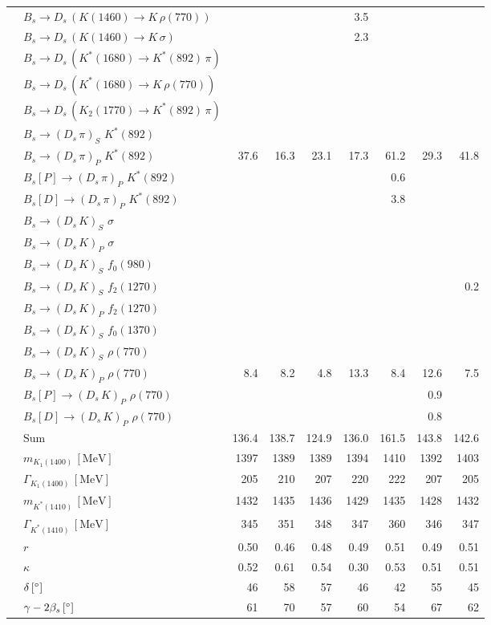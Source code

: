 \begin{tabular}{l l  r  r  r  r  r  r  r  }
 & $B_s \to D_s \, ( K(1460) \to K \, \rho(770) )$ &  &  &  & 3.5 &  &  &  \\ 
 & $B_s \to D_s \, ( K(1460) \to K \, \sigma )$ &  &  &  & 2.3 &  &  &  \\ 
 & $B_s \to D_s \, ( K^{*}(1680) \to K^{*}(892) \, \pi )$ &  &  &  &  &  &  &  \\ 
 & $B_s \to D_s \, ( K^{*}(1680) \to K \, \rho(770) )$ &  &  &  &  &  &  &  \\ 
 & $B_s \to D_s \, ( K_2(1770) \to K^{*}(892) \, \pi )$ &  &  &  &  &  &  &  \\ 
 & $B_s \to ( D_s \, \pi)_{S} \, \, K^{*}(892)$ &  &  &  &  &  &  &  \\ 
 & $B_s \to ( D_s \, \pi)_{P} \, \, K^{*}(892)$ & 37.6 & 16.3 & 23.1 & 17.3 & 61.2 & 29.3 & 41.8 \\ 
 & $B_s[P] \to ( D_s \, \pi)_{P} \, \, K^{*}(892)$ &  &  &  &  & 0.6 &  &  \\ 
 & $B_s[D] \to ( D_s \, \pi)_{P} \, \, K^{*}(892)$ &  &  &  &  & 3.8 &  &  \\ 
 & $B_s \to ( D_s \, K)_{S} \, \, \sigma$ &  &  &  &  &  &  &  \\ 
 & $B_s \to ( D_s \, K)_{P} \, \, \sigma$ &  &  &  &  &  &  &  \\ 
 & $B_s \to ( D_s \, K)_{S} \, \, f_0(980)$ &  &  &  &  &  &  &  \\ 
 & $B_s \to ( D_s \, K)_{S} \, \, f_2(1270)$ &  &  &  &  &  &  & 0.2 \\ 
 & $B_s \to ( D_s \, K)_{P} \, \, f_2(1270)$ &  &  &  &  &  &  &  \\ 
 & $B_s \to ( D_s \, K)_{S} \, \, f_0(1370)$ &  &  &  &  &  &  &  \\ 
 & $B_s \to ( D_s \, K)_{S} \, \, \rho(770)$ &  &  &  &  &  &  &  \\ 
 & $B_s \to ( D_s \, K)_{P} \, \, \rho(770)$ & 8.4 & 8.2 & 4.8 & 13.3 & 8.4 & 12.6 & 7.5 \\ 
 & $B_s[P] \to ( D_s \, K)_{P} \, \, \rho(770)$ &  &  &  &  &  & 0.9 &  \\ 
 & $B_s[D] \to ( D_s \, K)_{P} \, \, \rho(770)$ &  &  &  &  &  & 0.8 &  \\ 
 & $\text{Sum}$ & 136.4 & 138.7 & 124.9 & 136.0 & 161.5 & 143.8 & 142.6 \\ 
\hline
 & $m_{K_1(1400)} \, [\text{MeV}]$ & 1397 & 1389 & 1389 & 1394 & 1410 & 1392 & 1403 \\ 
 & $\Gamma_{K_1(1400)} \, [\text{MeV}]$ & 205 & 210 & 207 & 220 & 222 & 207 & 205 \\ 
 & $m_{K^{*}(1410)} \, [\text{MeV}]$ & 1432 & 1435 & 1436 & 1429 & 1435 & 1428 & 1432 \\ 
 & $\Gamma_{K^{*}(1410)} \, [\text{MeV}]$ & 345 & 351 & 348 & 347 & 360 & 346 & 347 \\ 
 & $r$ & 0.50 & 0.46 & 0.48 & 0.49 & 0.51 & 0.49 & 0.51 \\ 
 & $\kappa$ & 0.52 & 0.61 & 0.54 & 0.30 & 0.53 & 0.51 & 0.51 \\ 
 & $\delta \, [^{\circ}]$ & 46 & 58 & 57 & 46 & 42 & 55 & 45 \\ 
 & $\gamma - 2 \beta_{s} \, [^{\circ}]$ & 61 & 70 & 57 & 60 & 54 & 67 & 62 \\ 
\bottomrule
\end{tabular}
